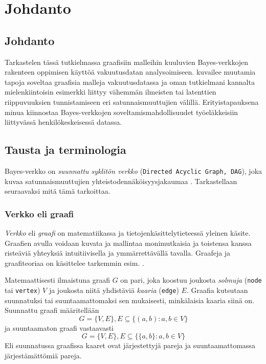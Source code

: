 \chapter{Johdanto\label{intro}}


\section{Johdanto}
Tarkastelen tässä tutkielmassa graafisiin malleihin kuuluvien Bayes-verkkojen rakenteen oppimisen käyttöä vakuutusdatan analysoimiseen. \citet{ramsahai_connecting_2020} kuvailee muutamia tapoja soveltaa graafisia malleja vakuutusdatassa ja oman tutkielmani kannalta mielenkiintoisin esimerkki liittyy vähemmän ilmeisten tai latenttien riippuvuuksien tunnistamiseen eri satunnaismuuttujien välillä. Erityistapauksena minua kiinnostaa Bayes-verkkojen soveltamismahdollisuudet työeläkkeisiin liittyvässä henkilökeskeisessä datassa.

\section{Tausta ja terminologia}
Bayes-verkko on \emph{suunnattu syklitön verkko} (\texttt{Directed Acyclic Graph, DAG}), joka kuvaa satunnaismuuttujien yhteistodennäköisyysjakaumaa \citep{ruggeri_bayesian_2008}. Tarkastellaan seuraavaksi mitä tämä tarkoittaa.

\subsection{Verkko eli graafi}
\emph{Verkko} eli \emph{graafi} on matematiikassa ja tietojenkäsittelytieteessä yleinen käsite. Graafien avulla voidaan  kuvata ja mallintaa monimutkaisia ja toistensa kanssa risteäviä yhteyksiä intuitiivisella ja ymmärrettävällä tavalla. Graafeja ja graafiteoriaa on käsittelee tarkemmin esim. \citet{diestel_graph_2017}.

Matemaattisesti ilmaistuna graafi $G$ on pari, joka koostuu joukosta \emph{solmuja} (\texttt{node} tai \texttt{vertex}) $V$ ja joukosta niitä yhdistäviä \emph{kaaria} (\texttt{edge}) $E$. Graafia kutsutaan suunnatuksi tai suuntaamattomaksi sen mukaisesti, minkälaisia kaaria siinä on. Suunnattu graafi määritellään 
$$
    G = \{V, E\}, E \subseteq \{(a,b) : a,b \in V \}
$$
ja suuntaamaton graafi vastaavasti
$$
    G = \{V, E\}, E \subseteq \{\{a,b\} : a,b \in V \}
$$
Eli suunnatussa graafissa kaaret ovat järjestettyjä pareja ja  suuntaamattomassa järjestämättömiä pareja.  

